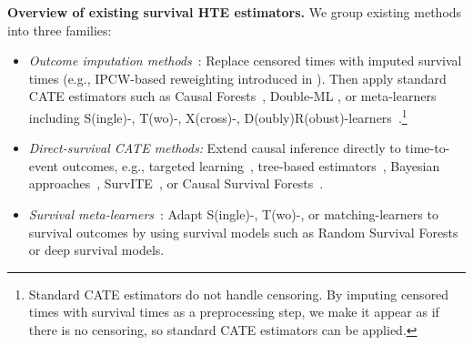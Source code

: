 \documentclass{article} %
\begin{document}
\textbf{Overview of existing survival HTE estimators.}
We group existing methods into three families:
\begin{itemize}[leftmargin=*,itemsep=0pt,topsep=-4pt]
    \item \textit{Outcome imputation methods}~\citep{xu2024estimating, meir2025heterogeneous}: Replace censored times with imputed survival times (e.g., IPCW-based reweighting introduced in \cite{qi2023an}). Then apply standard CATE estimators such as Causal Forests~\citep{athey2019grf}, Double-ML \citep{chernozhukov2018double}, or meta-learners including S(ingle)-, T(wo)-, X(cross)-, D(oubly)R(obust)-learners~\citep{athey2015machine, kunzel2019metalearners, kennedy2023towards}.\footnote{Standard CATE estimators do not handle censoring. By imputing censored times with survival times as a preprocessing step, we make it appear as if there is no censoring, so standard CATE estimators can be applied.}
    \item \textit{Direct-survival CATE methods:} Extend causal inference directly to time-to-event outcomes, e.g., targeted learning~\citep{van2011targeted}, 
    tree-based estimators~\citep{zhang2017mining}, Bayesian approaches~\citep{henderson2020individualized}, SurvITE~\citep{curth2021survite}, or Causal Survival Forests~\citep{cui2023estimating}.
    \item \textit{Survival meta-learners}~\citep{xu2023treatment, bo2024ameta, noroozizadeh2025impact}: Adapt S(ingle)-, T(wo)-, or matching-learners to survival outcomes by using survival models such as Random Survival Forests or deep survival models.
\end{itemize}
\end{document}
